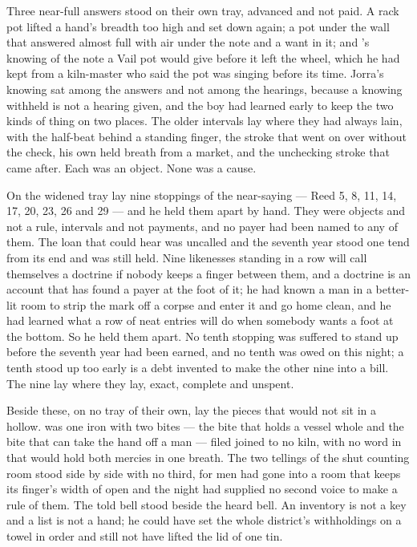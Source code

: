 Three near-full answers stood on their own tray, advanced and not paid. A rack pot lifted a hand's breadth too high and set down again; a pot under the wall that answered almost full with air under the note and a want in it; and 's knowing of the note a Vail pot would give before it left the wheel, which he had kept from a  kiln-master who said the pot was singing before its time. Jorra's knowing sat among the answers and not among the hearings, because a knowing withheld is not a hearing given, and the boy had learned early to keep the two kinds of thing on two places. The older intervals lay where they had always lain, with the half-beat behind a standing finger, the stroke that went on over  without the check, his own held breath from a market, and the unchecking stroke that came after. Each was an object. None was a cause.

On the widened tray lay nine stoppings of the near-saying --- Reed 5, 8, 11, 14, 17, 20, 23, 26 and 29 --- and he held them apart by hand. They were objects and not a rule, intervals and not payments, and no payer had been named to any of them. The loan that could hear was uncalled and the seventh year stood one tend from its end and was still held. Nine likenesses standing in a row will call themselves a doctrine if nobody keeps a finger between them, and a doctrine is an account that has found a payer at the foot of it; he had known a man in a better-lit room to strip the mark off a corpse and enter it and go home clean, and he had learned what a row of neat entries will do when somebody wants a foot at the bottom. So he held them apart. No tenth stopping was suffered to stand up before the seventh year had been earned, and no tenth was owed on this night; a tenth stood up too early is a debt invented to make the other nine into a bill. The nine lay where they lay, exact, complete and unspent.

Beside these, on no tray of their own, lay the pieces that would not sit in a hollow.  was one iron with two bites --- the bite that holds a vessel whole and the bite that can take the hand off a man --- filed joined to no kiln, with no word in  that would hold both mercies in one breath. The two tellings of the shut counting room stood side by side with no third, for men had gone into a room that keeps its finger's width of open and the night had supplied no second voice to make a rule of them. The told bell stood beside the heard bell. An inventory is not a key and a list is not a hand; he could have set the whole district's withholdings on a towel in order and still not have lifted the lid of one tin.

